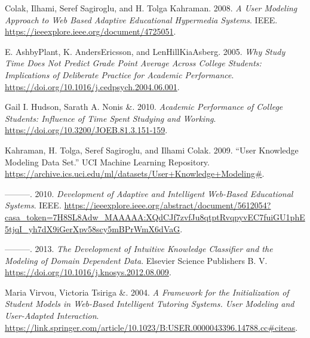 \documentclass[
]{article}
\newlength{\cslhangindent}
\newlength{\cslentryspacingunit} %
\newenvironment{CSLReferences}[2] %
 {%
  \setlength{\parindent}{0pt}
  \ifodd #1
  \let\oldpar\par
  \def\par{\hangindent=\cslhangindent\oldpar}
  \fi
  \setlength{\parskip}{#2\cslentryspacingunit}
 }%
 {}
\begin{document}
\hypertarget{refs}{}
\begin{CSLReferences}{1}{0}
\leavevmode{}%
Colak, Ilhami, Seref Sagiroglu, and H. Tolga Kahraman. 2008. \emph{A User Modeling Approach to Web Based Adaptive Educational Hypermedia Systems}. IEEE. \url{https://ieeexplore.ieee.org/document/4725051}.

\leavevmode{}%
E. AshbyPlant, K. AndersEricsson, and LenHillKiaAsberg. 2005. \emph{Why Study Time Does Not Predict Grade Point Average Across College Students: Implications of Deliberate Practice for Academic Performance}. \url{https://doi.org/10.1016/j.cedpsych.2004.06.001}.

\leavevmode{}%
Gail I. Hudson, Sarath A. Nonis \&. 2010. \emph{Academic Performance of College Students: Influence of Time Spent Studying and Working}. \url{https://doi.org/10.3200/JOEB.81.3.151-159}.

\leavevmode{}%
Kahraman, H. Tolga, Seref Sagiroglu, and Ilhami Colak. 2009. {``User Knowledge Modeling Data Set.''} UCI Machine Learning Repository. \url{https://archive.ics.uci.edu/ml/datasets/User+Knowledge+Modeling\#}.

\leavevmode{}%
---------. 2010. \emph{Development of Adaptive and Intelligent Web-Based Educational Systems}. IEEE. \url{https://ieeexplore.ieee.org/abstract/document/5612054?casa_token=7H8SL8Adw_MAAAAA:XQdCJf7zvfJu8qtptRvqpyvEC7fuiGU1phE5tjqI_yh7dX9iGerXpv58scy5mBPrWmX6dVaG}.

\leavevmode{}%
---------. 2013. \emph{The Development of Intuitive Knowledge Classifier and the Modeling of Domain Dependent Data}. Elsevier Science Publishers B. V. \url{https://doi.org/10.1016/j.knosys.2012.08.009}.

\leavevmode{}%
Maria Virvou, Victoria Tsiriga \&. 2004. \emph{A Framework for the Initialization of Student Models in Web-Based Intelligent Tutoring Systems. User Modeling and User-Adapted Interaction}. \url{https://link.springer.com/article/10.1023/B:USER.0000043396.14788.cc\#citeas}.

\end{CSLReferences}
\end{document}
